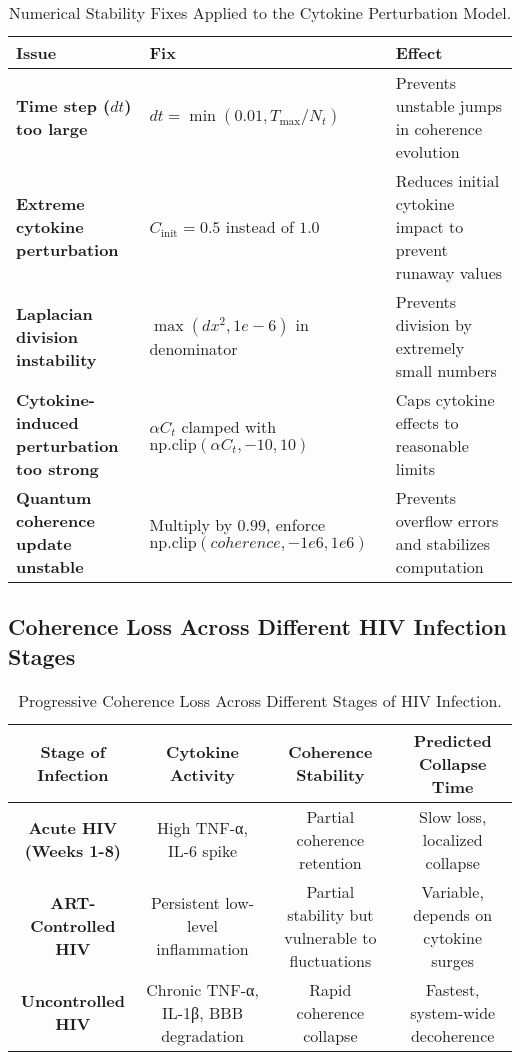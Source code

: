 \documentclass[12pt]{article}
\begin{document}
\begin{table}[H]
\centering
\caption{Numerical Stability Fixes Applied to the Cytokine Perturbation Model.}
\label{tab:stability_fixes}
\begin{tabular}{|p{5cm}|p{6cm}|p{5cm}|} 
\hline
\textbf{Issue} & \textbf{Fix} & \textbf{Effect} \\
\hline
\textbf{Time step (\(dt\)) too large} & \( dt = \min(0.01, T_{\max} / N_t) \) & Prevents unstable jumps in coherence evolution \\
\hline
\textbf{Extreme cytokine perturbation} & \( C_{\text{init}} = 0.5 \) instead of \( 1.0 \) & Reduces initial cytokine impact to prevent runaway values \\
\hline
\textbf{Laplacian division instability} & \( \max(dx^2, 1e-6) \) in denominator & Prevents division by extremely small numbers \\
\hline
\textbf{Cytokine-induced perturbation too strong} & \( \alpha C_t \) clamped with \( \text{np.clip}(\alpha C_t, -10, 10) \) & Caps cytokine effects to reasonable limits \\
\hline
\textbf{Quantum coherence update unstable} & Multiply by \( 0.99 \), enforce \( \text{np.clip}(coherence, -1e6, 1e6) \) & Prevents overflow errors and stabilizes computation \\
\hline
\end{tabular}
\end{table}

\subsection*{Coherence Loss Across Different HIV Infection Stages}
\begin{table}[H]
\centering
\caption{Progressive Coherence Loss Across Different Stages of HIV Infection.}
\label{tab:coherence_loss_stages}
\begin{tabular}{|c|c|c|c|}
\hline
\textbf{Stage of Infection} & \textbf{Cytokine Activity} & \textbf{Coherence Stability} & \textbf{Predicted Collapse Time} \\
\hline
\textbf{Acute HIV (Weeks 1-8)} & High TNF-α, IL-6 spike & Partial coherence retention & Slow loss, localized collapse \\
\hline
\textbf{ART-Controlled HIV} & Persistent low-level inflammation & Partial stability but vulnerable to fluctuations & Variable, depends on cytokine surges \\
\hline
\textbf{Uncontrolled HIV} & Chronic TNF-α, IL-1β, BBB degradation & Rapid coherence collapse & Fastest, system-wide decoherence \\
\hline
\end{tabular}
\end{table}
\end{document}
